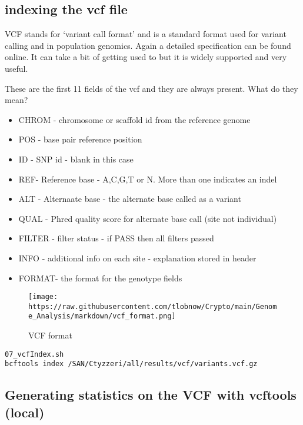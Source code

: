 \documentclass[
]{article}
\providecommand{\tightlist}{%
  \setlength{\itemsep}{0pt}\setlength{\parskip}{0pt}}
\begin{document}
\hypertarget{indexing-the-vcf-file}{%
\subsection{indexing the vcf file}\label{indexing-the-vcf-file}}

VCF stands for `variant call format' and is a standard format used for
variant calling and in population genomics. Again a detailed
specification can be found online. It can take a bit of getting used to
but it is widely supported and very useful.

These are the first 11 fields of the vcf and they are always present.
What do they mean?

\begin{itemize}
\tightlist
\item
  CHROM - chromosome or scaffold id from the reference genome
\item
  POS - base pair reference position
\item
  ID - SNP id - blank in this case
\item
  REF- Reference base - A,C,G,T or N. More than one indicates an indel
\item
  ALT - Alternaate base - the alternate base called as a variant
\item
  QUAL - Phred quality score for alternate base call (site not
  individual)
\item
  FILTER - filter status - if PASS then all filters passed
\item
  INFO - additional info on each site - explanation stored in header
\item
  FORMAT- the format for the genotype fields
\end{itemize}

\begin{figure}
\centering
\texttt{[image: https://raw.githubusercontent.com/tlobnow/Crypto/main/Genome\_Analysis/markdown/vcf\_format.png]}
\caption{VCF format}
\end{figure}

\begin{verbatim}
07_vcfIndex.sh
bcftools index /SAN/Ctyzzeri/all/results/vcf/variants.vcf.gz
\end{verbatim}

\hypertarget{generating-statistics-on-the-vcf-with-vcftools-local}{%
\subsection{Generating statistics on the VCF with vcftools
(local)}\label{generating-statistics-on-the-vcf-with-vcftools-local}}
\end{document}
